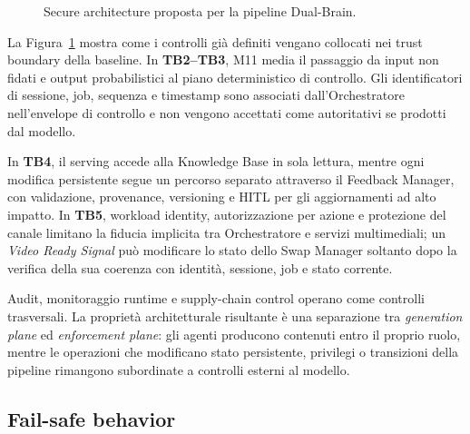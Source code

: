 \documentclass[11pt,a4paper]{article}
\begin{document}
\begin{figure}[H]
{%
}
\caption{Secure architecture proposta per la pipeline Dual-Brain.}
\label{fig:secure-architecture}
\end{figure}

La Figura~\ref{fig:secure-architecture} mostra come i controlli già
definiti vengano collocati nei trust boundary della baseline. In
\textbf{TB2--TB3}, M11 media il passaggio da input non fidati e output
probabilistici al piano deterministico di controllo. Gli identificatori
di sessione, job, sequenza e timestamp sono associati
dall'Orchestratore nell'envelope di controllo e non vengono accettati
come autoritativi se prodotti dal modello.

In \textbf{TB4}, il serving accede alla Knowledge Base in sola lettura,
mentre ogni modifica persistente segue un percorso separato attraverso
il Feedback Manager, con validazione, provenance, versioning e HITL per
gli aggiornamenti ad alto impatto. In \textbf{TB5}, workload identity,
autorizzazione per azione e protezione del canale limitano la fiducia
implicita tra Orchestratore e servizi multimediali; un
\emph{Video Ready Signal} può modificare lo stato dello Swap Manager
soltanto dopo la verifica della sua coerenza con identità, sessione,
job e stato corrente.

Audit, monitoraggio runtime e supply-chain control operano come
controlli trasversali. La proprietà architetturale risultante è una
separazione tra \emph{generation plane} ed \emph{enforcement plane}:
gli agenti producono contenuti entro il proprio ruolo, mentre le
operazioni che modificano stato persistente, privilegi o transizioni
della pipeline rimangono subordinate a controlli esterni al modello.

\subsection{Fail-safe behavior}
\label{subsec:fail-safe}
\end{document}
